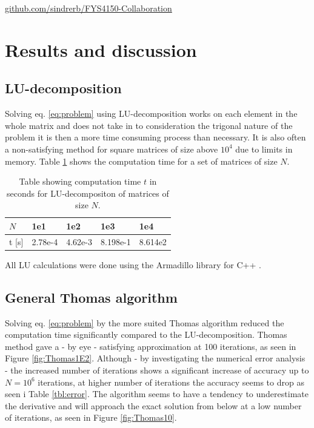 \documentclass[twoside,twocolumn]{article}
\begin{document}
\begin{center}
 \href{https://github.com/sindrerb/FYS4150-Collaboration}{github.com/sindrerb/FYS4150-Collaboration}
\end{center}

\newpage

\section{Results and discussion}

\subsection{LU-decomposition}

Solving eq. \ref{eq:problem} using LU-decomposition works on each element in the whole matrix and does not take in to consideration the trigonal nature of the problem it is then a more time consuming process than necessary. It is also often a non-satisfying method for square matrices of size above $10^4$ due to limits in memory. Table \ref{tbl:time_LU} shows the computation time for a set of matrices of size $N$.

\begin{table}[h]
\begin{tabular}{|l|l|l|l|l|} \hline
$N$ & 1e1 & 1e2 & 1e3 & 1e4\\ \hline
t [s] & 2.78e-4 &4.62e-3 & 8.198e-1 & 8.614e2\\ \hline
\end{tabular}
\caption{Table showing computation time $t$ in seconds for LU-decompositon of matrices of size $N$.} \label{tbl:time_LU}
\end{table}

All LU calculations were done using the Armadillo library for C++ \cite{arma}.

\subsection{General Thomas algorithm}

Solving eq. \ref{eq:problem} by the more suited Thomas algorithm reduced the computation time significantly compared to the LU-decomposition. Thomas method gave a - by eye - satisfying approximation at 100 iterations, as seen in Figure \ref{fig:Thomas1E2}. Although - by investigating the numerical error analysis - the increased number of iterations shows a significant increase of accuracy up to $N=10^6$ iterations, at higher number of iterations the accuracy seems to drop as seen i Table \ref{tbl:error}.
The algorithm seems to have a tendency to underestimate the derivative and will approach the exact solution from below at a low number of iterations, as seen in Figure \ref{fig:Thomas10}.
\end{document}

